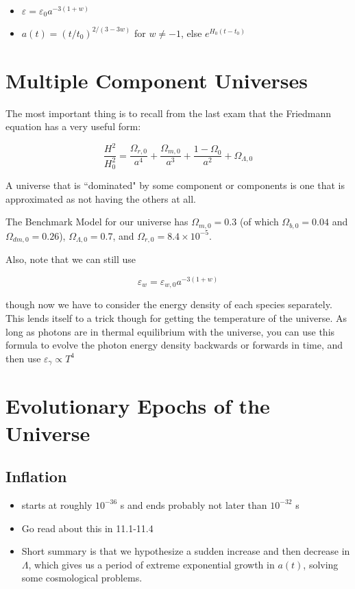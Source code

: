 \documentclass[12pt]{article}
\begin{document}
\begin{itemize}
\item \(\varepsilon=\varepsilon_0 a ^{-3(1+w)}\)
\item \(a(t) =(t/t_0)^{2/(3-3w)}\) for \(w \ne -1\), else \(e^{H_0(t-t_0)}\)
\end{itemize}



\section{Multiple Component Universes}

The most important thing is to recall from the last exam that the Friedmann equation has a very useful form:

\[ \frac{H^2}{H_0^2} = \frac{\Omega_{r,0}}{a^4} + \frac{\Omega_{m,0}}{a^3} + \frac{1-\Omega_{0}}{a^2} +\Omega_{\Lambda,0}
\]

A universe that is ``dominated" by some component or components is one that is approximated as not having the others at all.

The Benchmark Model for our universe has \(\Omega_{m,0} = 0.3\) (of which \(\Omega_{b,0} = 0.04\) and \(\Omega_{dm,0} = 0.26\)), \(\Omega_{\Lambda,0} = 0.7\), and \(\Omega_{r,0} = 8.4 \times 10^{-5}\).

Also, note that we can still use

\[\varepsilon_w=\varepsilon_{w,0} a ^{-3(1+w)}
\]

though now we have to consider the energy density of each species separately. This lends itself to a trick though for getting the temperature of the universe. As long as photons are in thermal equilibrium with the universe, you can use this formula to evolve the photon energy density backwards or forwards in time, and then use \(\varepsilon_\gamma \propto T^4\)


\section{Evolutionary Epochs of the Universe}


\subsection{Inflation }

\begin{itemize}

\item starts at roughly \(10^{-36}\) s and ends probably not later than \(10^{-32}\) s 

\item Go read about this in 11.1-11.4

\item Short summary is that we hypothesize a sudden increase and then decrease in \(\Lambda\), which gives us a period of extreme exponential growth in \(a(t)\), solving some cosmological problems.
\end{itemize}
\end{document}
